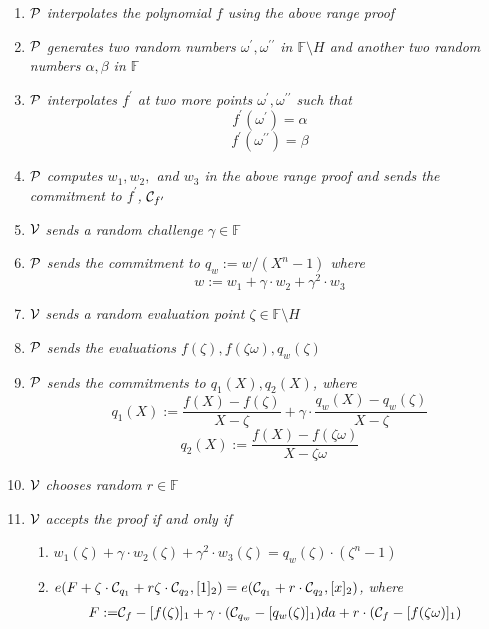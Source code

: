 \begin{enumerate}
    \item $\mathcal{P}$ \textit{interpolates the polynomial $f$ using the above range proof}
    \item $\mathcal{P}$ \textit{generates two random numbers $\omega^{\prime},\omega^{\prime\prime}$ in $\mathbb{F}\setminus{H}$ and another two random numbers $\alpha,\beta$ in $\mathbb{F}$}
    \item $\mathcal{P}$ \textit{interpolates $f^\prime$ at two more points ${\omega^{\prime},\omega^{\prime\prime}}$ such that}
    \[ f^\prime(\omega^{\prime})=\alpha \]
    \[ f^\prime(\omega^{\prime\prime})=\beta \]
    \item $\mathcal{P}$ \textit{computes $w_1,w_2,$ and $w_3$ in the above range proof and sends the commitment to $f^\prime$,} $\mathcal{C}_{f^\prime}$
    \item $\mathcal{V}$ \textit{sends a random challenge $\gamma\in\mathbb{F}$}
    \item $\mathcal{P}$ \textit{sends the commitment to $q_w:=w/(X^n-1)$ where}
    \[ w:=w_1+\gamma\cdot{w_2}+\gamma^2\cdot{w_3} \]
    \item $\mathcal{V}$ \textit{sends a random evaluation point $\zeta\in\mathbb{F}\setminus{H}$}
    \item $\mathcal{P}$ \textit{sends the evaluations $f(\zeta),f(\zeta\omega),q_w(\zeta)$}
    \item $\mathcal{P}$ \textit{sends the commitments to $q_1(X),q_2(X)$, where}
    \[ q_1(X):=\frac{f(X)-f(\zeta)}{X-\zeta}+\gamma\cdot\frac{q_w(X)-q_w(\zeta)}{X-\zeta} \]
    \[ q_2(X):=\frac{f(X)-f(\zeta\omega)}{X-\zeta\omega} \]
    \item $\mathcal{V}$ \textit{chooses random $r\in\mathbb{F}$}
    \item $\mathcal{V}$ \textit{accepts the proof if and only if}
    \begin{enumerate}
    	\item $w_1(\zeta)+\gamma\cdot{w_2(\zeta)}+\gamma^2\cdot{w_3(\zeta)}=q_w(\zeta)\cdot(\zeta^n-1)$
    	\item $e(F+\zeta\cdot\mathcal{C}_{q_1}+r\zeta\cdot\mathcal{C}_{q_2},[1]_2)=e(\mathcal{C}_{q_1}+r\cdot\mathcal{C}_{q_2},[x]_2)$\textit{, where}
    	\begin{align*}
    		F:=&\mathcal{C}_f-[f(\zeta)]_1+\gamma\cdot(\mathcal{C}_{q_w}-[q_w(\zeta)]_1)da+r\cdot(\mathcal{C}_f-[f(\zeta\omega)]_1)
    	\end{align*}
    \end{enumerate}

\end{enumerate}
